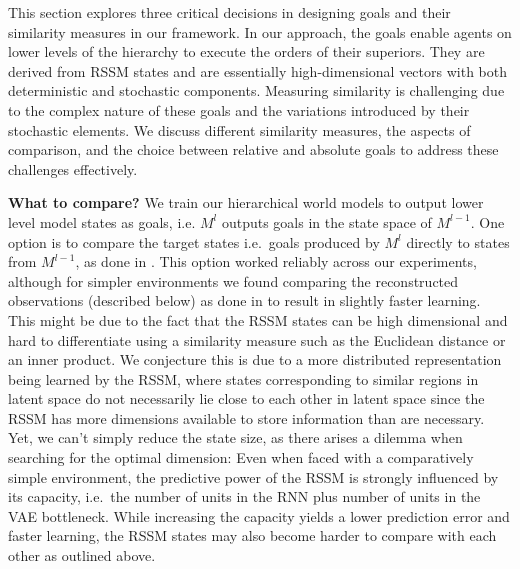 \documentclass{article}
\begin{document}
This section explores three critical decisions in designing goals and their similarity measures in our framework. 
In our approach, the goals enable agents on lower levels of the hierarchy to execute the orders of their superiors. They are derived from RSSM states and are essentially high-dimensional vectors with both deterministic and stochastic components. 
Measuring similarity is challenging due to the complex nature of these goals and the variations introduced by their stochastic elements. 
We discuss different similarity measures, the aspects of comparison, and the choice between relative and absolute goals to address these challenges effectively.

\textbf{What to compare?} We train our hierarchical world models to output lower level model states as goals, i.e. $M^l$ outputs goals in the state space of $M^{l-1}$. One option is to compare the target states i.e.\ goals produced by $M^l$ directly to states from $M^{l-1}$, as done in \citet{hafner2022deep, vezhnevets2017feudal}. This option worked reliably across our experiments, although for simpler environments we found comparing the reconstructed observations (described below) as done in \citet{nachum2018data} to result in slightly faster learning.
This might be due to the fact that the RSSM states can be high dimensional and hard to differentiate using a similarity measure such as the Euclidean distance or an inner product. We conjecture this is due to a more distributed representation being learned by the RSSM, where states corresponding to similar regions in latent space do not necessarily lie close to each other in latent space since the RSSM has more dimensions available to store information than are necessary. Yet, we can't simply reduce the state size, as there arises a dilemma when searching for the optimal dimension: Even when faced with a comparatively simple environment, the predictive power of the RSSM is strongly influenced by its capacity, i.e.\ the number of units in the RNN plus number of units in the VAE bottleneck. While increasing the capacity yields a lower prediction error and faster learning, the RSSM states may also become harder to compare with each other as outlined above.
\end{document}
